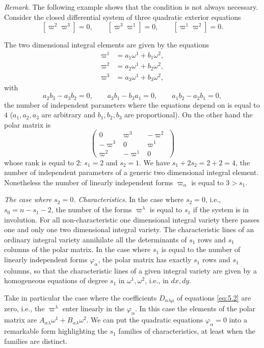 \documentclass[leqno,11pt]{book}
\numberwithin{equation}{chapter}
\theoremstyle{shape1}
\theoremstyle{shape0}
\theoremstyle{shape2}
\theoremstyle{definition}
\begin{document}
\vspace{12pt}\fsec \emph{Remark}. The following example shows that the condition is not always necessary. Consider the closed differential system of three quadratic exterior equations
\[
[\varpi^{2}\varpi^{3}]=0,\qquad[\varpi^{3}\varpi^{1}]=0,\qquad [\varpi^{1}\varpi^{2}]=0.
\]

The two dimensional integral elements are given by the equations
\begin{align*}
  \varpi^{1}&=a_{1}\omega^{1}+b_{1}\omega^{2},\\
  \varpi^{2}&=a_{2}\omega^{1}+b_{2}\omega^{2},\\
  \varpi^{3}&=a_{3}\omega^{1}+b_{3}\omega^{2},
\end{align*}
with
\[
a_{2}b_{3}-a_{3}b_{2}=0,\qquad a_{3}b_{1}-b_{3}a_{1}=0,\qquad a_{1}b_{2}-a_{2}b_{1}=0,
\]
the number of independent parameters where the equations depend on is equal to $4$ ($a_{1},a_{2},a_{3}$ are arbitrary and $b_{1},b_{2},b_{3}$ are proportional). On the other hand the polar matrix is
\[
\begin{pmatrix}
  0&\varpi^{3}&-\varpi^{2}\\
  -\varpi^{3}&0&\varpi^{1}\\
  \varpi^{2}&-\varpi^{1}&0
\end{pmatrix}
\]
whose rank is equal to $2$: $s_{1}=2$ and $s_{2}=1$. We have $s_{1}+2s_{2}=2+2=4$, the number of independent parameters of a generic two dimensional integral element. Nonetheless the number of linearly independent forms $\varpi_{\alpha}$ is equal to $3>s_{1}$.

\vspace{12pt}\fsec \emph{The case where $s_{2}=0$. Characteristics}. In the case where $s_{2}=0$, i.e., $s_{0}=n-s_{1}-2$, the number of the forms $\varpi^{\lambda}$ is equal to $s_{1}$ if the system is in involution. For all non-characteristic one dimensional integral variety there passes one and only one two dimensional integral variety. The characteristic lines of an ordinary integral variety annihilate all the determinants of $s_{1}$ rows and $s_{1}$ columns of the polar matrix. In the case where $s_{1}$ is equal to the number of linearly independent forms $\varphi_{\alpha}$, the polar matrix has exactly $s_{1}$ rows and $s_{1}$ columns, so that the characteristic lines of a given integral variety are given by a homogeneous equations of degree $s_{1}$ in $\omega^{1},\omega^{2}$, i.e., in $dx,dy$.

Take in particular the case where the coefficients $D_{\alpha\lambda\mu}$ of equations \eqref{eq:5.2} are zero, i.e., the $\varpi^{\lambda}$ enter linearly in the $\varphi_{\alpha}$. In this case the elements of the polar matrix are $A_{\alpha\lambda}\omega^{1}+B_{\alpha\lambda}\omega^{2}$. We can put the quadratic equations $\varphi_{\alpha}=0$ into a remarkable form highlighting the $s_{1}$ families of characteristics, at least when the families are distinct.
\end{document}
